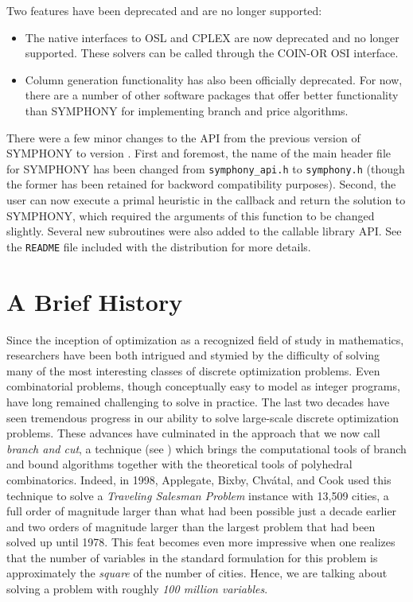 Two features have been deprecated and are no longer supported:

\begin{itemize}

\item The native interfaces to OSL and CPLEX are now deprecated and no longer
supported. These solvers can be called through the COIN-OR OSI interface.

\item Column generation functionality has also been officially deprecated. For
now, there are a number of other software packages that offer better
functionality than SYMPHONY for implementing branch and price algorithms.

\end{itemize}

There were a few minor changes to the API from the previous version of
SYMPHONY to version \VER. First and foremost, the name of the main header file
for SYMPHONY has been changed from \texttt{symphony\_api.h} to
\texttt{symphony.h} (though the former has been retained for backword
compatibility purposes). Second, the user can now execute a primal heuristic
in the  callback and return the solution to
SYMPHONY, which required the arguments of this function to be changed
slightly. Several new subroutines were also added to the callable library API.
See the \texttt{README} file included with the distribution for more details.

\section{A Brief History}
\label{history}

Since the inception of optimization as a recognized field of study in
mathematics, researchers have been both intrigued and stymied by the
difficulty of solving many of the most interesting classes of discrete
optimization problems. Even combinatorial problems, though conceptually easy
to model as integer programs, have long remained challenging to solve in
practice. The last two decades have seen tremendous progress in our ability to
solve large-scale discrete optimization problems. These advances have
culminated in the approach that we now call {\it branch and cut}, a technique
(see \cite{Grotschel84cut,padb:branc,hoff:LP}) which brings the computational
tools of branch and bound algorithms together with the theoretical tools of
polyhedral combinatorics. Indeed, in 1998, Applegate, Bixby, Chv\'atal, and
Cook used this technique to solve a {\em Traveling Salesman Problem} instance
with 13,509 cities, a full order of magnitude larger than what had been
possible just a decade earlier \cite{concorde} and two orders of magnitude
larger than the largest problem that had been solved up until 1978. This feat
becomes even more impressive when one realizes that the number of variables in
the standard formulation for this problem is approximately the {\em square} of
the number of cities. Hence, we are talking about solving a problem with
roughly {\em 100 million variables}.

